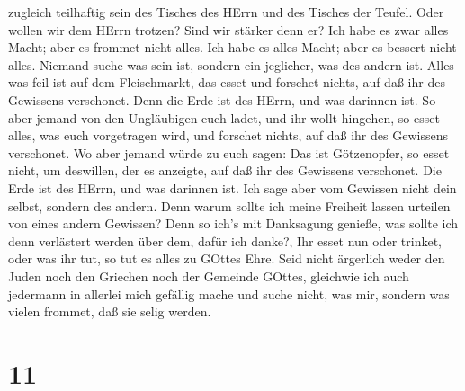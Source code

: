 zugleich teilhaftig sein des Tisches des HErrn und des Tisches der
Teufel.  Oder wollen wir dem HErrn trotzen? Sind wir
stärker denn er?  Ich habe es zwar alles Macht; aber es
frommet nicht alles. Ich habe es alles Macht; aber es bessert nicht
alles.  Niemand suche was sein ist, sondern ein jeglicher,
was des andern ist.  Alles was feil ist auf dem
Fleischmarkt, das esset und forschet nichts, auf daß ihr des Gewissens
verschonet.  Denn die Erde ist des HErrn, und was darinnen
ist.  So aber jemand von den Ungläubigen euch ladet, und
ihr wollt hingehen, so esset alles, was euch vorgetragen wird, und
forschet nichts, auf daß ihr des Gewissens verschonet.  Wo
aber jemand würde zu euch sagen: Das ist Götzenopfer, so esset nicht, um
deswillen, der es anzeigte, auf daß ihr des Gewissens verschonet. Die
Erde ist des HErrn, und was darinnen ist.  Ich sage aber
vom Gewissen nicht dein selbst, sondern des andern. Denn warum sollte
ich meine Freiheit lassen urteilen von eines andern Gewissen?
 Denn so ich's mit Danksagung genieße, was sollte ich denn
verlästert werden über dem, dafür ich danke?,  Ihr esset
nun oder trinket, oder was ihr tut, so tut es alles zu GOttes Ehre.
 Seid nicht ärgerlich weder den Juden noch den Griechen
noch der Gemeinde GOttes,  gleichwie ich auch jedermann in
allerlei mich gefällig mache und suche nicht, was mir, sondern was
vielen frommet, daß sie selig werden.

\hypertarget{section-10}{%
\section{11}\label{section-10}}

